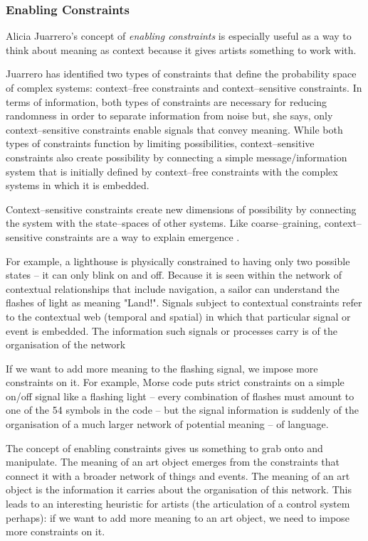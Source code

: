\documentclass[letterpaper]{article}
\begin{document}
    \subsubsection{Enabling Constraints}

    Alicia Juarrero's concept of \emph{enabling constraints} is especially useful as a way to think about meaning as context because it gives artists something to work with.
    
    Juarrero has identified two types of constraints that define the probability space of complex systems: context–free constraints and context–sensitive constraints. In terms of information, both types of constraints are necessary for reducing randomness in order to separate information from noise but, she says, only context–sensitive constraints enable signals that convey meaning. While both types of constraints function by limiting possibilities, context–sensitive constraints also create possibility by connecting a simple message/information system that is initially defined by context–free constraints with the complex systems in which it is embedded.
    
    Context–sensitive constraints create new dimensions of possibility by connecting the system with the state–spaces of other systems. Like coarse–graining, context–sensitive constraints are a way to explain emergence \citep[p.193]{JuarreroThSlfOrgnstnOfIntntnlActn2004} \citep[p.240]{JuarreroCsltyAsCnstrnt1998}.

    For example, a lighthouse is physically constrained to having only two possible states – it can only blink on and off. Because it is seen within the network of contextual relationships that include navigation, a sailor can understand the flashes of light as meaning "Land!". Signals subject to contextual constraints refer to the contextual web (temporal and spatial) in which that particular signal or event is embedded. The information such signals or processes carry is of the organisation of the network \citep[p.237]{JuarreroCsltyAsCnstrnt1998}
    
    If we want to add more meaning to the flashing signal, we impose more constraints on it. For example, Morse code puts strict constraints on a simple on/off signal like a flashing light – every combination of flashes must amount to one of the 54 symbols in the code – but the signal information is suddenly of the organisation of a much larger network of potential meaning – of language.

    The concept of enabling constraints gives us something to grab onto and manipulate. The meaning of an art object emerges from the constraints that connect it with a broader network of things and events. The meaning of an art object is the information it carries about the organisation of this network. This leads to an interesting heuristic for artists (the articulation of a control system perhaps): if we want to add more meaning to an art object, we need to impose more constraints on it.
\end{document}
